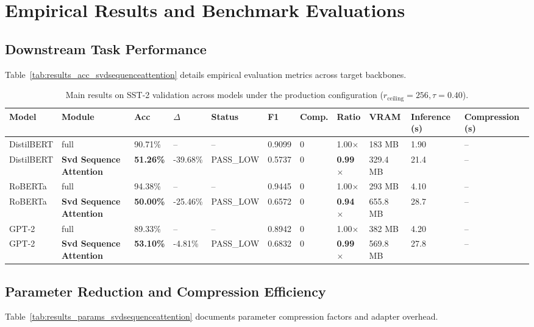 \section{Empirical Results and Benchmark Evaluations}

\subsection{Downstream Task Performance}
Table~\ref{tab:results_acc_svdsequenceattention} details empirical evaluation metrics across target backbones.

\begin{table}[t]
\centering
\small
\begin{tabular}{lllllllllll}
\toprule
\textbf{Model} & \textbf{Module} & \textbf{Acc} & \textbf{$\Delta$} & \textbf{Status} & \textbf{F1} & \textbf{Comp.} & \textbf{Ratio} & \textbf{VRAM} & \textbf{Inference (s)} & \textbf{Compression (s)} \\
\midrule
DistilBERT & full & 90.71\% & -- & -- & 0.9099 & 0 & 1.00$\times$ & 183 MB & 1.90 & -- \\
DistilBERT & \textbf{Svd Sequence Attention} & \textbf{51.26\%} & -39.68\% & PASS\_LOW & 0.5737 & 0 & \textbf{0.99$\times$} & 329.4 MB & 21.4 & -- \\
RoBERTa & full & 94.38\% & -- & -- & 0.9445 & 0 & 1.00$\times$ & 293 MB & 4.10 & -- \\
RoBERTa & \textbf{Svd Sequence Attention} & \textbf{50.00\%} & -25.46\% & PASS\_LOW & 0.6572 & 0 & \textbf{0.94$\times$} & 655.8 MB & 28.7 & -- \\
GPT-2 & full & 89.33\% & -- & -- & 0.8942 & 0 & 1.00$\times$ & 382 MB & 4.20 & -- \\
GPT-2 & \textbf{Svd Sequence Attention} & \textbf{53.10\%} & -4.81\% & PASS\_LOW & 0.6832 & 0 & \textbf{0.99$\times$} & 569.8 MB & 27.8 & -- \\
\bottomrule
\end{tabular}
\caption{Main results on SST-2 validation across models under the production configuration ($r_{\mathrm{ceiling}}=256, \tau=0.40$).}
\label{tab:main_sst2}
\end{table}

\subsection{Parameter Reduction and Compression Efficiency}
Table~\ref{tab:results_params_svdsequenceattention} documents parameter compression factors and adapter overhead.

